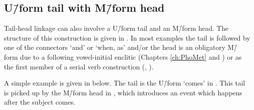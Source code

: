 \subsection{U\=/form tail with M\=/form head}\label{sec:UforTaiMforHea}
Tail-head linkage can also involve a U\=/form tail and an M\=/form head.
The structure of this construction is given in .
In most examples the tail is followed by one of the connectors
 `and' or   `when, as' and/or the head is an obligatory
M\=/form due to a following vowel-initial enclitic (Chapters \ref{ch:PhoMet} and )
or as the first member of a serial verb construction (, ).

\begin{exe}
	\label{ex:THL U/M}
\end{exe}

A simple example is given in  below.
The tail is the U\=/form  `comes' in .
This tail is picked up by the M\=/form head in ,
which introduces an event which happens after the subject comes.

\begin{exe}
	\label{ex:120923-1, 6.56-6.59}
	\begin{xlist}
		\label{ex:120923-1, 6.56}
		\label{ex:120923-1, 6.59 2}
	\end{xlist}
\end{exe}

